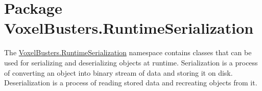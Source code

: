 \hypertarget{namespace_voxel_busters_1_1_runtime_serialization}{}\section{Package Voxel\+Busters.\+Runtime\+Serialization}
\label{namespace_voxel_busters_1_1_runtime_serialization}


The \hyperlink{namespace_voxel_busters_1_1_runtime_serialization}{Voxel\+Busters.\+Runtime\+Serialization} namespace contains classes that can be used for serializing and deserializing objects at runtime. Serialization is a process of converting an object into binary stream of data and storing it on disk. Deserialization is a process of reading stored data and recreating objects from it.  


